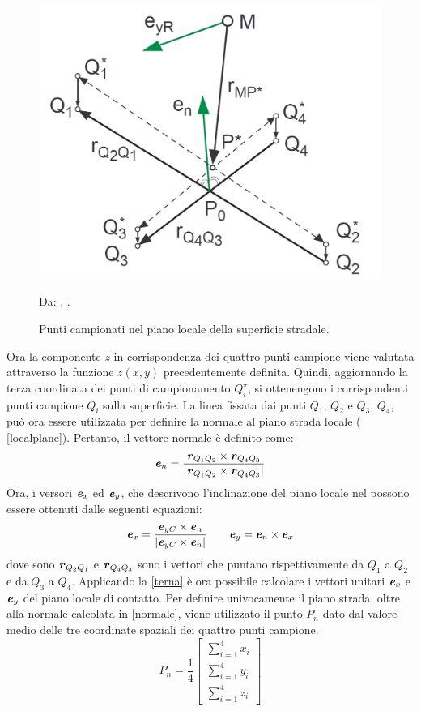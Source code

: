 \begin{figure}[h]
	\centering
	\includegraphics[width=0.5\linewidth]{Figures/local_track}
	\caption{Punti campionati nel piano locale della superficie stradale.}
	Da: \citeauthor{Rill}, .
	\label{localtrack}
\end{figure}

Ora la componente $z$ in corrispondenza dei quattro punti campione viene valutata attraverso la funzione $z(x,y)$ precedentemente definita. Quindi, aggiornando la terza coordinata dei punti di campionamento $Q^\star_i$, si ottenengono i corrispondenti punti campione $Q_i$ sulla superficie. La linea fissata dai punti $Q_1$, $Q_2$ e $Q_3$, $Q_4$, può ora essere utilizzata per definire la normale al piano strada locale (\figurename{ \ref{localplane}}). Pertanto, il vettore normale è definito come:
%
\begin{equation}
\textbf{\textit{e}}_n = \frac{\textbf{\textit{r}}_{Q_1 Q_2} \times \textbf{\textit{r}}_{Q_4 Q_3}}{|\textbf{\textit{r}}_{Q_1 Q_2} \times \textbf{\textit{r}}_{Q_4 Q_3}|}
\label{normale}
\end{equation}
%
Ora, i versori $\textbf{\textit{e}}_x$ ed $\textbf{\textit{e}}_y$, che descrivono l'inclinazione del piano locale nel possono essere ottenuti dalle seguenti equazioni:
%
\begin{equation}
\textbf{\textit{e}}_x = \frac{\textbf{\textit{e}}_{yC}\times\textbf{\textit{e}}_{n}}{|\textbf{\textit{e}}_{yC}\times\textbf{\textit{e}}_{n}|}
\qquad
\textbf{\textit{e}}_{y} = \textbf{\textit{e}}_{n}\times\textbf{\textit{e}}_{x}
\label{terna}
\end{equation}
%
dove sono $\textbf{\textit{r}}_{Q_2 Q_1}$ e $\textbf{\textit{r}}_{Q_4 Q_3}$ sono i vettori che puntano rispettivamente da $Q_1$ a $Q_2$ e da $Q_3$ a $Q_4$. Applicando la \eqref{terna} è ora possibile calcolare i vettori unitari $\textbf{\textit{e}}_{x}$ e $\textbf{\textit{e}}_{y}$ del piano locale di contatto. Per definire univocamente il piano strada, oltre alla normale calcolata in \eqref{normale}, viene utilizzato il punto $P_n$ dato dal valore medio delle tre coordinate spaziali dei quattro punti campione.
%
\begin{equation}
P_n = \frac{1}{4}\begin{bmatrix}
\sum_{i=1}^{4} x_i \\
\sum_{i=1}^{4} y_i \\
\sum_{i=1}^{4} z_i
\end{bmatrix}
\end{equation}
%
